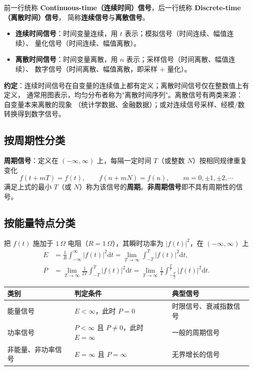 前一行统称 \textbf{Continuous-time（连续时间）信号}，后一行统称 \textbf{Discrete-time（离散时间）信号}，
简称\textbf{连续信号}与\textbf{离散信号}。

\begin{itemize}
\item \textbf{连续时间信号}：时间变量连续，用 $t$ 表示；模拟信号（时间连续、幅值连续）、
  量化信号（时间连续、幅值离散）。
\item \textbf{离散时间信号}：时间变量离散，用 $n$ 表示；采样信号（时间离散、幅值连续）、
  数字信号（时间离散、幅值离散，即采样 $+$ 量化）。
\end{itemize}

\textbf{约定}：连续时间信号在自变量的连续值上都有定义；离散时间信号仅在整数值上有定义，
通常用图表示，均匀分布者称为"离散时间序列"。离散信号有两类来源：自变量本来离散的现象
（统计学数据、金融数据）；或对连续信号采样、经模/数转换得到数字信号。

\subsection{按周期性分类}

\textbf{周期信号}：定义在 $(-\infty,\infty)$ 上，每隔一定时间 $T$（或整数 $N$）按相同规律重复变化
\begin{equation}
f(t+mT)=f(t),\qquad f(n+mN)=f(n),\qquad m=0,\pm1,\pm2,\cdots
\end{equation}
满足上式的最小 $T$（或 $N$）称为该信号的\textbf{周期}。\textbf{非周期信号}即不具有周期性的信号。

\subsection{按能量特点分类}

把 $f(t)$ 施加于 $1\,\Omega$ 电阻（$R=1\,\Omega$），其瞬时功率为 $|f(t)|^2$，在 $(-\infty,\infty)$ 上
\begin{align}
E&=\frac{1}{R}\int_{-\infty}^{\infty}\big|f(t)\big|^2\mathrm{d}t
=\lim_{T\to\infty}\int_{-T}^{T}\big|f(t)\big|^2\mathrm{d}t,\\
P&=\lim_{T\to\infty}\frac{1}{2T}\int_{-T}^{T}\big|f(t)\big|^2\mathrm{d}t
=\lim_{T\to\infty}\frac{1}{T}\int_{-\frac{T}{2}}^{\frac{T}{2}}\big|f(t)\big|^2\mathrm{d}t.
\end{align}

\begin{center}
\small
\begin{tabular}{lll}
\toprule
类别 & 判定条件 & 典型信号 \\
\midrule
能量信号 & $E<\infty$，此时 $P=0$ & 时限信号、衰减指数信号 \\
功率信号 & $P<\infty$ 且 $P\neq0$，此时 $E=\infty$ & 一般的周期信号 \\
非能量、非功率信号 & $E=\infty$ 且 $P=\infty$ & 无界增长的信号 \\
\bottomrule
\end{tabular}
\end{center}

